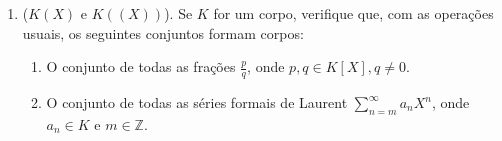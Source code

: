 \begin{enumerate}[label=5.\arabic*.]
\begin{enumerate}
    \end{enumerate}
    \item ($K(X)$ e $K((X))$). Se $K$ for um corpo, verifique que, com as operações usuais, os seguintes conjuntos formam corpos:
    \begin{enumerate}
        \item[(i)] O conjunto de todas as frações $\frac{p}{q}$, onde $p, q \in K[X], q \neq 0$.
        \item[(ii)] O conjunto de todas as séries formais de Laurent $\sum_{n=m}^{\infty} a_n X^n$, onde $a_n \in K$ e $m \in \mathbb{Z}$.
    \end{enumerate}
\end{enumerate}
